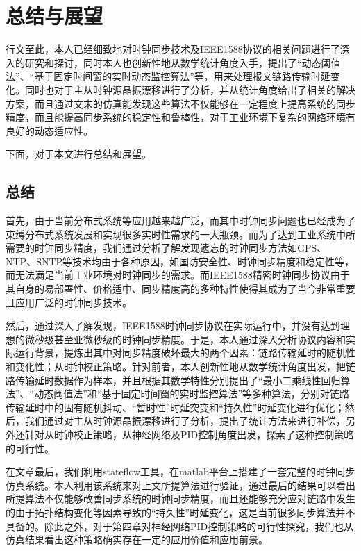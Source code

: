 
\chapter{总结与展望}
行文至此，本人已经细致地对时钟同步技术及IEEE1588协议的相关问题进行了深入的研究和探讨，同时本人也创新性地从数学统计角度入手，提出了“动态阈值法”、“基于固定时间窗的实时动态监控算法”等，用来处理报文链路传输时延变化。同时也对于主从时钟源晶振漂移进行了分析，并从统计角度给出了相关的解决方案，而且通过文末的仿真能发现这些算法不仅能够在一定程度上提高系统的同步精度，而且能提高同步系统的稳定性和鲁棒性，对于工业环境下复杂的网络环境有良好的动态适应性。

下面，对于本文进行总结和展望。

\section{总结}
首先，由于当前分布式系统等应用越来越广泛，而其中时钟同步问题也已经成为了束缚分布式系统发展和实现很多实时性需求的一大瓶颈。而为了达到工业系统中所需要的时钟同步精度，我们通过分析了解发现遗忘的时钟同步方法如GPS、NTP、SNTP等技术均由于各种原因，如国防安全性、时钟同步精度和稳定性等，而无法满足当前工业环境对时钟同步的需求。而IEEE1588精密时钟同步协议由于其自身的易部署性、价格适中、同步精度高的多种特性使得其成为了当今非常重要且应用广泛的时钟同步技术。

然后，通过深入了解发现，IEEE1588时钟同步协议在实际运行中，并没有达到理想的微秒级甚至亚微秒级的时钟同步精度。于是，本人通过深入分析协议内容和实际运行背景，提炼出其中对同步精度破坏最大的两个因素：链路传输延时的随机性和变化性；从时钟校正策略。针对前者，本人创新性地从数学统计角度出发，把链路传输延时数据作为样本，并且根据其数学特性分别提出了“最小二乘线性回归算法”、“动态阈值法”和“基于固定时间窗的实时监控算法”等多种算法，分别对链路传输延时中的固有随机抖动、“暂时性”时延突变和“持久性”时延变化进行优化；然后，我们通过对主从时钟源晶振漂移进行了分析，提出了统计方法来进行补偿，另外还针对从时钟校正策略，从神经网络及PID控制角度出发，探索了这种控制策略的可行性。

在文章最后，我们利用stateflow工具，在matlab平台上搭建了一套完整的时钟同步仿真系统。本人利用该系统来对上文所提算法进行验证，通过最后的结果可以看出所提算法不仅能够改善同步系统的时钟同步精度，而且还能够充分应对链路中发生的由于拓扑结构变化等因素导致的“持久性”时延变化，这是当前很多同步算法并不具备的。除此之外，对于第四章对神经网络PID控制策略的可行性探究，我们也从仿真结果看出这种策略确实存在一定的应用价值和应用前景。

